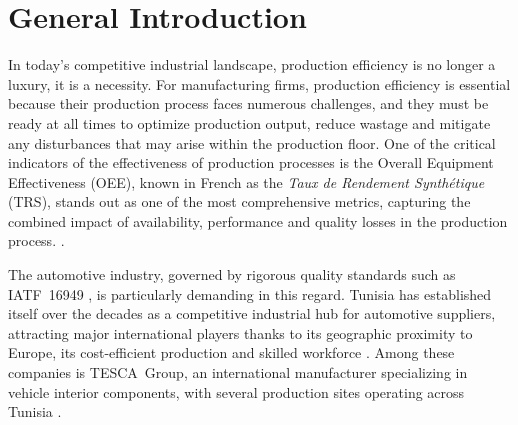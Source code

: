 %
%    


\section*{General Introduction}

\hspace*{0.778cm}
In today's competitive industrial landscape, production efficiency
is no longer a luxury, it is a necessity. For manufacturing firms, production efficiency is essential because their production process
faces numerous challenges, and they must be ready at all times to optimize production output,
reduce wastage and mitigate any disturbances that may arise within the production floor. One of
the critical indicators of the effectiveness of production processes is the Overall Equipment
Effectiveness (OEE), known in French as the \textit{Taux de Rendement
Synthétique} (TRS), stands out as one of the most comprehensive
metrics, capturing the combined impact of availability, performance
and quality losses in the production process.
\cite{mrpeasy_oee}.

\par\vspace{0.3cm}

\hspace*{0.25cm}The automotive industry, governed by rigorous quality standards such
as IATF~16949 \cite{aiag_iatf16949}, is particularly
demanding in this regard. Tunisia has established itself over the
decades as a competitive industrial hub for automotive suppliers,
attracting major international players thanks to its geographic
proximity to Europe, its cost-efficient production and skilled
workforce \cite{fipa_tunisia_automotive}. Among these companies is TESCA~Group, an
international manufacturer specializing in vehicle interior components,
with several production sites operating across Tunisia
\cite{tesca_official}.

\par\vspace{0.3cm}


